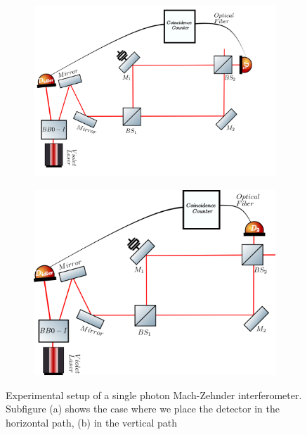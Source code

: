 \documentclass[12pt]{book}
\begin{document}
\begin{figure}[t!]
\centering
\begin{subfigure}[b]{0.45\linewidth}
\includegraphics[scale=0.25]{images/machzehnder_single1.png}
\caption{}
\end{subfigure}
\begin{subfigure}[b]{0.45\linewidth}
\includegraphics[scale=0.25]{images/machzehnder_single2.png}
\caption{}
\end{subfigure}
\caption{Experimental setup of a single photon Mach-Zehnder interferometer. Subfigure (a) shows the case where we place the detector in the horizontal path, (b) in the vertical path}
\label{newsingle1000}
\end{figure}
\end{document}
